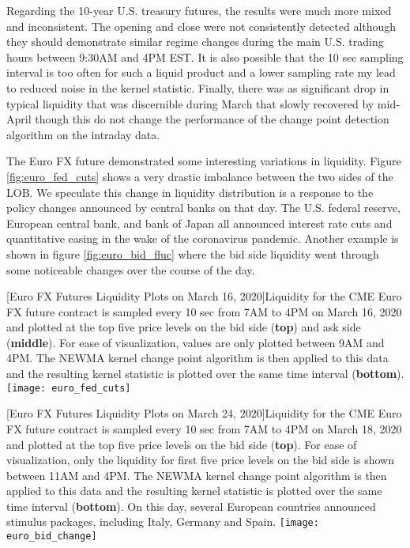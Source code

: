 Regarding the 10-year U.S. treasury futures, the results were much more mixed and inconsistent. The opening and close were not consistently detected although they should demonstrate similar regime changes during the main U.S. trading hours between 9:30AM and 4PM EST. It is also possible that the 10 sec sampling interval is too often for such a liquid product and a lower sampling rate my lead to reduced noise in the kernel statistic. Finally, there was as significant drop in typical liquidity that was discernible during March that slowly recovered by mid-April though this do not change the performance of the change point detection algorithm on the intraday data. 

The Euro FX future demonstrated some interesting variations in liquidity. Figure \ref{fig:euro_fed_cuts} shows a very drastic imbalance between the two sides of the LOB. We speculate this change in liquidity distribution is a response to the policy changes announced by central banks on that day. The U.S. federal reserve, European central bank, and bank of Japan all announced interest rate cuts and quantitative easing in the wake of the coronavirus pandemic. Another example is shown in figure \ref{fig:euro_bid_fluc} where the bid side liquidity went through some noticeable changes over the course of the day. 

\begin{center} 
[Euro FX Futures Liquidity Plots on March 16, 2020]{Liquidity for the CME Euro FX future contract is sampled every 10 sec from 7AM to 4PM on March 16, 2020 and plotted at the top five price levels on the bid side (\textbf{top}) and ask side (\textbf{middle}). For ease of visualization, values are only plotted between 9AM and 4PM. The NEWMA kernel change point algorithm is then applied to this data and the resulting kernel statistic is plotted over the same time interval (\textbf{bottom}). }
\texttt{[image: euro\_fed\_cuts]} 
\label{fig:euro_fed_cuts} 
\end{center}

\begin{minipage}{0.96\textwidth}
\begin{center} 
[Euro FX Futures Liquidity Plots on March 24, 2020]{Liquidity for the CME Euro FX future contract is sampled every 10 sec from 7AM to 4PM on March 18, 2020 and plotted at the top five price levels on the bid side (\textbf{top}). For ease of visualization, only the liquidity for first five price levels on the bid side is shown between 11AM and 4PM. The NEWMA kernel change point algorithm is then applied to this data and the resulting kernel statistic is plotted over the same time interval (\textbf{bottom}). On this day, several European countries announced stimulus packages, including Italy, Germany and Spain.}
\texttt{[image: euro\_bid\_change]} 
\label{fig:euro_bid_fluc} 
\end{center}
\end{minipage}

